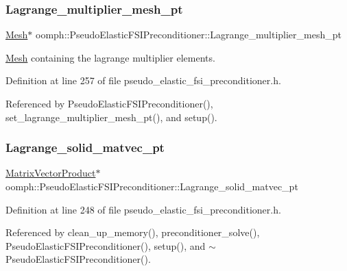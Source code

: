 \subsubsection{\texorpdfstring{Lagrange\+\_\+multiplier\+\_\+mesh\+\_\+pt}{Lagrange\_multiplier\_mesh\_pt}}
{\footnotesize\ttfamily \hyperlink{classoomph_1_1Mesh}{Mesh}$\ast$ oomph\+::\+Pseudo\+Elastic\+F\+S\+I\+Preconditioner\+::\+Lagrange\+\_\+multiplier\+\_\+mesh\+\_\+pt\hspace{0.3cm}{\ttfamily [private]}}



\hyperlink{classoomph_1_1Mesh}{Mesh} containing the lagrange multiplier elements. 



Definition at line 257 of file pseudo\+\_\+elastic\+\_\+fsi\+\_\+preconditioner.\+h.



Referenced by Pseudo\+Elastic\+F\+S\+I\+Preconditioner(), set\+\_\+lagrange\+\_\+multiplier\+\_\+mesh\+\_\+pt(), and setup().

\mbox{\label{classoomph_1_1PseudoElasticFSIPreconditioner_a1129dcb6e7e335aca44acdb4231adc38}} 
\subsubsection{\texorpdfstring{Lagrange\+\_\+solid\+\_\+matvec\+\_\+pt}{Lagrange\_solid\_matvec\_pt}}
{\footnotesize\ttfamily \hyperlink{classoomph_1_1MatrixVectorProduct}{Matrix\+Vector\+Product}$\ast$ oomph\+::\+Pseudo\+Elastic\+F\+S\+I\+Preconditioner\+::\+Lagrange\+\_\+solid\+\_\+matvec\+\_\+pt\hspace{0.3cm}{\ttfamily [private]}}



Definition at line 248 of file pseudo\+\_\+elastic\+\_\+fsi\+\_\+preconditioner.\+h.



Referenced by clean\+\_\+up\+\_\+memory(), preconditioner\+\_\+solve(), Pseudo\+Elastic\+F\+S\+I\+Preconditioner(), setup(), and $\sim$\+Pseudo\+Elastic\+F\+S\+I\+Preconditioner().

